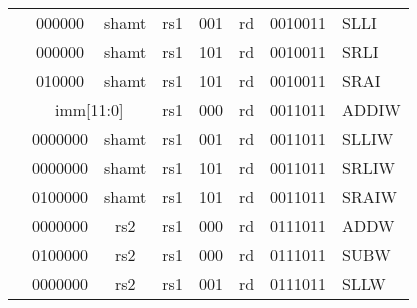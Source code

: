 \begin{table}[p]
\begin{small}
\begin{center}
\begin{tabular}{p{0in}p{0.4in}p{0.05in}p{0.05in}p{0.05in}p{0.05in}p{0.4in}p{0.6in}p{0.4in}p{0.6in}p{0.7in}l}
&
\multicolumn{3}{|c|}{000000} &
\multicolumn{3}{c|}{shamt} &
\multicolumn{1}{c|}{rs1} &
\multicolumn{1}{c|}{001} &
\multicolumn{1}{c|}{rd} &
\multicolumn{1}{c|}{0010011} & SLLI \\
\cline{2-11}


&
\multicolumn{3}{|c|}{000000} &
\multicolumn{3}{c|}{shamt} &
\multicolumn{1}{c|}{rs1} &
\multicolumn{1}{c|}{101} &
\multicolumn{1}{c|}{rd} &
\multicolumn{1}{c|}{0010011} & SRLI \\
\cline{2-11}


&
\multicolumn{3}{|c|}{010000} &
\multicolumn{3}{c|}{shamt} &
\multicolumn{1}{c|}{rs1} &
\multicolumn{1}{c|}{101} &
\multicolumn{1}{c|}{rd} &
\multicolumn{1}{c|}{0010011} & SRAI \\
\cline{2-11}


&
\multicolumn{6}{|c|}{imm[11:0]} &
\multicolumn{1}{c|}{rs1} &
\multicolumn{1}{c|}{000} &
\multicolumn{1}{c|}{rd} &
\multicolumn{1}{c|}{0011011} & ADDIW \\
\cline{2-11}


&
\multicolumn{4}{|c|}{0000000} &
\multicolumn{2}{c|}{shamt} &
\multicolumn{1}{c|}{rs1} &
\multicolumn{1}{c|}{001} &
\multicolumn{1}{c|}{rd} &
\multicolumn{1}{c|}{0011011} & SLLIW \\
\cline{2-11}


&
\multicolumn{4}{|c|}{0000000} &
\multicolumn{2}{c|}{shamt} &
\multicolumn{1}{c|}{rs1} &
\multicolumn{1}{c|}{101} &
\multicolumn{1}{c|}{rd} &
\multicolumn{1}{c|}{0011011} & SRLIW \\
\cline{2-11}


&
\multicolumn{4}{|c|}{0100000} &
\multicolumn{2}{c|}{shamt} &
\multicolumn{1}{c|}{rs1} &
\multicolumn{1}{c|}{101} &
\multicolumn{1}{c|}{rd} &
\multicolumn{1}{c|}{0011011} & SRAIW \\
\cline{2-11}


&
\multicolumn{4}{|c|}{0000000} &
\multicolumn{2}{c|}{rs2} &
\multicolumn{1}{c|}{rs1} &
\multicolumn{1}{c|}{000} &
\multicolumn{1}{c|}{rd} &
\multicolumn{1}{c|}{0111011} & ADDW \\
\cline{2-11}


&
\multicolumn{4}{|c|}{0100000} &
\multicolumn{2}{c|}{rs2} &
\multicolumn{1}{c|}{rs1} &
\multicolumn{1}{c|}{000} &
\multicolumn{1}{c|}{rd} &
\multicolumn{1}{c|}{0111011} & SUBW \\
\cline{2-11}


&
\multicolumn{4}{|c|}{0000000} &
\multicolumn{2}{c|}{rs2} &
\multicolumn{1}{c|}{rs1} &
\multicolumn{1}{c|}{001} &
\multicolumn{1}{c|}{rd} &
\multicolumn{1}{c|}{0111011} & SLLW \\
\cline{2-11}



\end{tabular}
\end{center}
\end{small}
\end{table}
